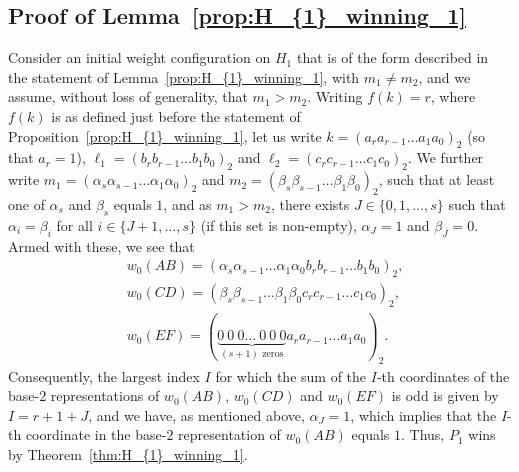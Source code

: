 \documentclass[11pt,reqno]{amsart}
\theoremstyle{definition}
\theoremstyle{definition}
\begin{document}
\subsection{Proof of Lemma~\ref{prop:H_{1}_winning_1}}
Consider an initial weight configuration on $H_{1}$ that is of the form described in the statement of Lemma~\ref{prop:H_{1}_winning_1}, with $m_{1} \neq m_{2}$, and we assume, without loss of generality, that $m_{1} > m_{2}$. Writing $f(k)=r$, where $f(k)$ is as defined just before the statement of Proposition~\ref{prop:H_{1}_winning_1}, let us write $k=(a_{r}a_{r-1}\ldots a_{1}a_{0})_{2}$ (so that $a_{r}=1$), $\ell_{1}=(b_{r}b_{r-1}\ldots b_{1}b_{0})_{2}$ and $\ell_{2}=(c_{r}c_{r-1}\ldots c_{1}c_{0})_{2}$. We further write $m_{1}=(\alpha_{s}\alpha_{s-1}\ldots \alpha_{1}\alpha_{0})_{2}$ and $m_{2}=(\beta_{s}\beta_{s-1}\ldots \beta_{1}\beta_{0})_{2}$, such that at least one of $\alpha_{s}$ and $\beta_{s}$ equals $1$, and as $m_{1} > m_{2}$, there exists $J \in \{0,1,\ldots,s\}$ such that $\alpha_{i}=\beta_{i}$ for all $i \in \{J+1,\ldots,s\}$ (if this set is non-empty), $\alpha_{J}=1$ and $\beta_{J}=0$. Armed with these, we see that
\begin{align}
{}&w_{0}(AB)=(\alpha_{s}\alpha_{s-1}\ldots \alpha_{1}\alpha_{0}b_{r}b_{r-1}\ldots b_{1}b_{0})_{2},\nonumber\\
{}&w_{0}(CD)=(\beta_{s}\beta_{s-1}\ldots \beta_{1}\beta_{0}c_{r}c_{r-1}\ldots c_{1}c_{0})_{2},\nonumber\\
{}&w_{0}(EF)=(\underbrace{0\ 0\ 0 \ldots\ 0\ 0\ 0}_{(s+1) \text{ zeros}}a_{r}a_{r-1}\ldots a_{1}a_{0})_{2}.\nonumber
\end{align}
Consequently, the largest index $I$ for which the sum of the $I$-th coordinates of the base-$2$ representations of $w_{0}(AB)$, $w_{0}(CD)$ and $w_{0}(EF)$ is odd is given by $I=r+1+J$, and we have, as mentioned above, $\alpha_{J}=1$, which implies that the $I$-th coordinate in the base-$2$ representation of $w_{0}(AB)$ equals $1$. Thus, $P_{1}$ wins by Theorem~\ref{thm:H_{1}_winning_1}.
\end{document}
